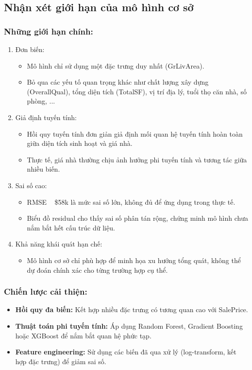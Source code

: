 \subsection{Nhận xét giới hạn của mô hình cơ sở}
\subsubsection{Những giới hạn chính:}
\begin{enumerate}
  \item Đơn biến:
    \begin{itemize}
      \item[-] Mô hình chỉ sử dụng một đặc trưng duy nhất (GrLivArea).
      \item[-] Bỏ qua các yếu tố quan trọng khác như chất lượng xây dựng (OverallQual), tổng diện tích (TotalSF), vị trí địa lý, tuổi thọ căn nhà, số phòng, ...
    \end{itemize}
  \item Giả định tuyến tính:
    \begin{itemize}
      \item[-] Hồi quy tuyến tính đơn giản giả định mối quan hệ tuyến tính hoàn toàn giữa diện tích sinh hoạt và giá nhà.
      \item[-] Thực tế, giá nhà thường chịu ảnh hưởng phi tuyến tính và tương tác giữa nhiều biến.
    \end{itemize}
  \item Sai số cao:
    \begin{itemize}
      \item[-] RMSE ~ \$58k là mức sai số lớn, không đủ để ứng dụng trong thực tế.
      \item[-] Biểu đồ residual cho thấy sai số phân tán rộng, chứng minh mô hình chưa nắm bắt hết cấu trúc dữ liệu.
    \end{itemize}
  \item Khả năng khái quát hạn chế:
    \begin{itemize}
      \item[-] Mô hình cơ sở chỉ phù hợp để minh họa xu hướng tổng quát, không thể dự đoán chính xác cho từng trường hợp cụ thể.
    \end{itemize}
\end{enumerate}
\subsubsection{Chiến lược cải thiện:}
\begin{itemize}
  \item[-] \textbf{Hồi quy đa biến:} Kết hợp nhiều đặc trưng có tương quan cao với SalePrice.
  \item[-] \textbf{Thuật toán phi tuyến tính:} Áp dụng Random Forest, Gradient Boosting hoặc XGBoost để nắm bắt quan hệ phức tạp.
  \item[-] \textbf{Feature engineering:} Sử dụng các biến đã qua xử lý (log-transform, kết hợp đặc trưng) để giảm sai số.
\end{itemize}
